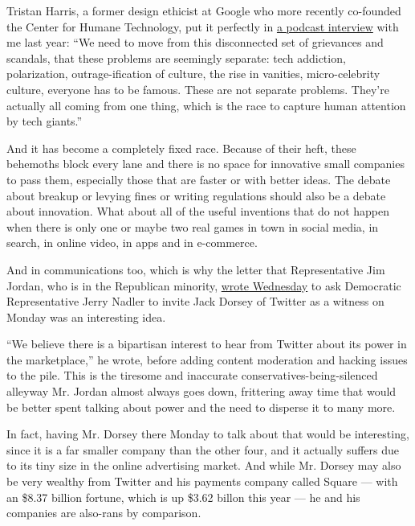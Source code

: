 Tristan Harris, a former design ethicist at Google who more recently
co-founded the Center for Humane Technology, put it perfectly in
\href{https://www.vox.com/recode/2019/5/6/18530860/tristan-harris-human-downgrading-time-well-spent-kara-swisher-recode-decode-podcast-interview}{a
podcast interview} with me last year: ``We need to move from this
disconnected set of grievances and scandals, that these problems are
seemingly separate: tech addiction, polarization, outrage-ification of
culture, the rise in vanities, micro-celebrity culture, everyone has to
be famous. These are not separate problems. They're actually all coming
from one thing, which is the race to capture human attention by tech
giants.''

And it has become a completely fixed race. Because of their heft, these
behemoths block every lane and there is no space for innovative small
companies to pass them, especially those that are faster or with better
ideas. The debate about breakup or levying fines or writing regulations
should also be a debate about innovation. What about all of the useful
inventions that do not happen when there is only one or maybe two real
games in town in social media, in search, in online video, in apps and
in e-commerce.

And in communications too, which is why the letter that Representative
Jim Jordan, who is in the Republican minority,
\href{https://abcnews.go.com/Politics/house-republicans-call-twitter-ceo-jack-dorsey-join/story?id=71925923}{wrote
Wednesday} to ask Democratic Representative Jerry Nadler to invite Jack
Dorsey of Twitter as a witness on Monday was an interesting idea.

``We believe there is a bipartisan interest to hear from Twitter about
its power in the marketplace,'' he wrote, before adding content
moderation and hacking issues to the pile. This is the tiresome and
inaccurate conservatives-being-silenced alleyway Mr. Jordan almost
always goes down, frittering away time that would be better spent
talking about power and the need to disperse it to many more.

In fact, having Mr. Dorsey there Monday to talk about that would be
interesting, since it is a far smaller company than the other four, and
it actually suffers due to its tiny size in the online advertising
market. And while Mr. Dorsey may also be very wealthy from Twitter and
his payments company called Square --- with an \$8.37 billion fortune,
which is up \$3.62 billon this year --- he and his companies are
also-rans by comparison.

